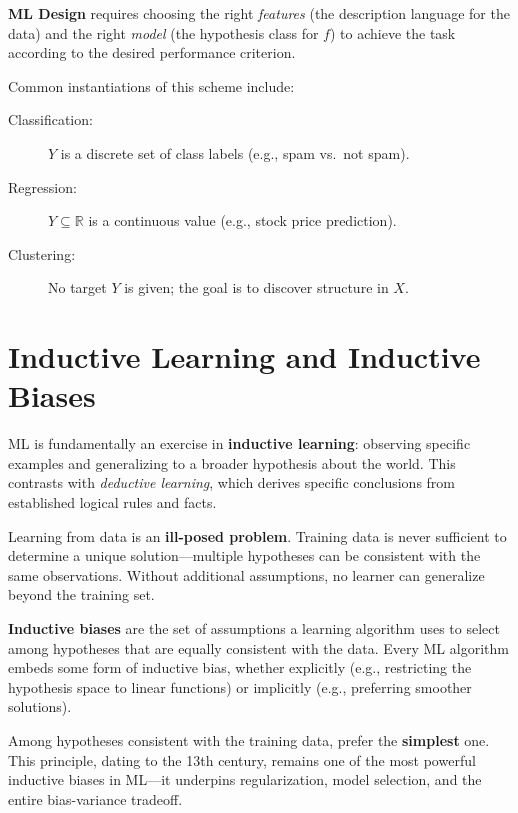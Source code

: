 \textbf{ML Design} requires choosing the right \textit{features} (the description language for the data) and the right \textit{model} (the hypothesis class for $f$) to achieve the task according to the desired performance criterion.

Common instantiations of this scheme include:
\begin{description}
    \item[Classification:] $Y$ is a discrete set of class labels (e.g., spam vs.\ not spam).
    \item[Regression:] $Y \subseteq \mathbb{R}$ is a continuous value (e.g., stock price prediction).
    \item[Clustering:] No target $Y$ is given; the goal is to discover structure in $X$.
\end{description}

\section*{Inductive Learning and Inductive Biases}

ML is fundamentally an exercise in \textbf{inductive learning}: observing specific examples and generalizing to a broader hypothesis about the world. This contrasts with \textit{deductive learning}, which derives specific conclusions from established logical rules and facts.

\begin{remark}
Learning from data is an \textbf{ill-posed problem}. Training data is never sufficient to determine a unique solution---multiple hypotheses can be consistent with the same observations. Without additional assumptions, no learner can generalize beyond the training set.
\end{remark}

\textbf{Inductive biases} are the set of assumptions a learning algorithm uses to select among hypotheses that are equally consistent with the data. Every ML algorithm embeds some form of inductive bias, whether explicitly (e.g., restricting the hypothesis space to linear functions) or implicitly (e.g., preferring smoother solutions).

\begin{definition}
Among hypotheses consistent with the training data, prefer the \textbf{simplest} one. This principle, dating to the 13th century, remains one of the most powerful inductive biases in ML---it underpins regularization, model selection, and the entire bias-variance tradeoff.
\end{definition}

